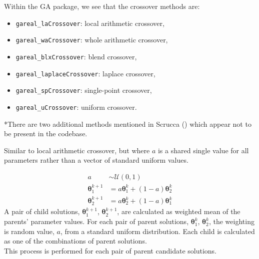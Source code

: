 \documentclass[
  a4paper,
  DIV=11,
  numbers=noendperiod]{scrartcl}
\newcommand{\B}[1]{\boldsymbol{#1}}
\newcommand{\+}{\phantom{-}}
\begin{document}
Within the GA package, we see that the crossover methods are:

\begin{itemize}
  \item[{[default]}] \verb|gareal_laCrossover|: local arithmetic crossover,
  \item[--] \verb|gareal_waCrossover|: whole arithmetic crossover,
  \item[--] \verb|gareal_blxCrossover|: blend crossover,
  \item[--] \verb|gareal_laplaceCrossover|: laplace crossover,
  \item[{[missing]}]\verb|gareal_spCrossover|: single-point crossover,
  \item[{[missing]}]\verb|gareal_uCrossover|: uniform crossover.
\end{itemize}

*There are two additional methods mentioned in Scrucca
() which appear not to be present in the
codebase.

\begin{tcolorbox}[title=Whole arithmetic crossover: \texttt{gareal\_waCrossover()}]
Similar to local arithmetic crossover, but where $a$ is a shared single value for all parameters rather than a vector of standard uniform values.

$$
\begin{aligned}
a &\sim \mathcal U\!\left(0,1\right)\\
\B\theta_1^{k+1} &= a \B\theta_1^k +\left(1-a\right)\B\theta_2^k \\
\B\theta_2^{k+1} &= a \B\theta_2^k +\left(1-a\right)\B\theta_1^k
\end{aligned}
$$
A pair of child solutions, $\B\theta_1^{k+1}$, $\B\theta_2^{k+1}$, are calculated as weighted mean of the parents' parameter values. For each pair of parent solutions, $\B\theta^k_1$, $\B\theta^k_2$, the weighting is random value, $a$, from a standard uniform distribution. Each child is calculated as one of the combinations of parent solutions.\\

This process is performed for each pair of parent candidate solutions.
\end{tcolorbox}
\end{document}
